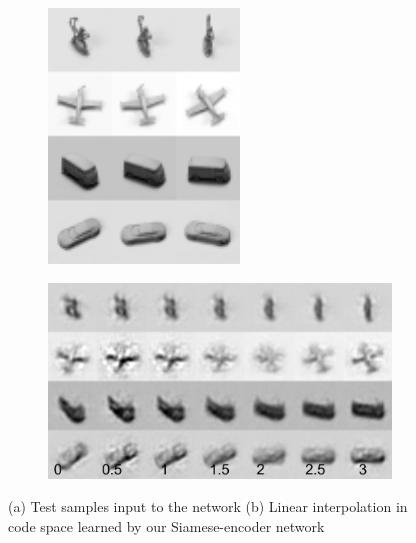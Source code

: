 \begin{figure}
  \centering
   \begin{subfigure}[b]{0.193\textwidth}
        \includegraphics[width=\textwidth]{./figures/linear/taco/original.png}
        \caption{}
          \label{fig:sample}
    \end{subfigure} 
  \begin{subfigure}[b]{0.45\textwidth}
        \includegraphics[width=\textwidth]{./figures/linear/taco/siamese_interp_num.png} 
        \caption{}
          \label{fig:baseline}
  \end{subfigure}
  \caption{(a) Test samples input to the network (b) Linear interpolation in code space learned by our Siamese-encoder network}
\end{figure}


